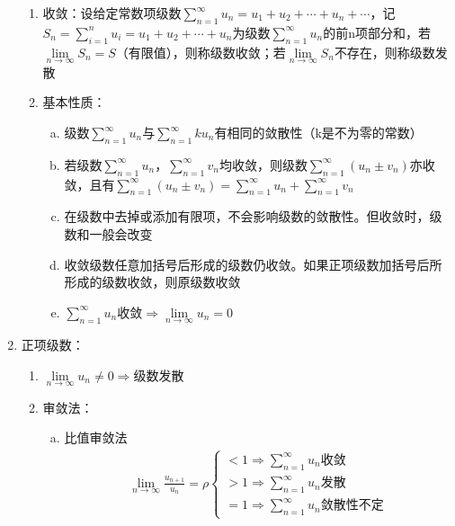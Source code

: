 \documentclass[12pt]{book}
\begin{document}
\begin{enumerate}[1.]
          \begin{enumerate}[(1)]
              \item 收敛：设给定常数项级数$\sum_{n=1}^{\infty}{u_n} = u_{1}+u_{2}+\cdots+u_{n}+\cdots$，记$S_n=\sum_{i=1}^{n}{u_i} = u_{1}+u_{2}+\cdots+u_{n}$为级数$\sum_{n=1}^{\infty}{u_n}$的前n项部分和，若$\lim\limits_{n\rightarrow\infty}{S_n}=S$（有限值），则称级数收敛；若$\lim\limits_{n\rightarrow\infty}{S_n}$不存在，则称级数发散
              \item 基本性质：
                    \begin{enumerate}[a.]
                        \item 级数$\sum_{n=1}^{\infty}{u_n}$与$\sum_{n=1}^{\infty}{k u_n}$有相同的敛散性（k是不为零的常数）
                        \item 若级数$\sum_{n=1}^{\infty}{u_n}$，$\sum_{n=1}^{\infty}{v_n}$均收敛，则级数$\sum_{n=1}^{\infty}{(u_n\pm v_n)}$亦收敛，且有$\sum_{n=1}^{\infty}{(u_n\pm v_n)}=\sum_{n=1}^{\infty}{u_n}+\sum_{n=1}^{\infty}{v_n}$
                        \item 在级数中去掉或添加有限项，不会影响级数的敛散性。但收敛时，级数和一般会改变
                        \item 收敛级数任意加括号后形成的级数仍收敛。如果正项级数加括号后所形成的级数收敛，则原级数收敛
                        \item $\sum_{n=1}^{\infty}{u_n}$收敛$\Rightarrow \lim\limits_{n\rightarrow\infty}{u_n}=0$
                    \end{enumerate}
          \end{enumerate}
    \item 正项级数：
    \begin{enumerate}[(1)]
        \item $\lim\limits_{n\rightarrow\infty}{u_n}\neq 0\Rightarrow$级数发散
        \item 审敛法：
        \begin{enumerate}[a.]
            \item 比值审敛法
            \begin{gather*}
                \lim_{n\rightarrow\infty}{\frac{u_{n+1}}{u_{n}}}=\rho \begin{cases}
                    <1 \Rightarrow \sum_{n=1}^{\infty}{u_n} \text{收敛} \\
                    >1 \Rightarrow \sum_{n=1}^{\infty}{u_n} \text{发散} \\
                    =1 \Rightarrow \sum_{n=1}^{\infty}{u_n} \text{敛散性不定} 
                \end{cases}

\end{gather*}
\end{enumerate}
\end{enumerate}
\end{enumerate}
\end{document}
